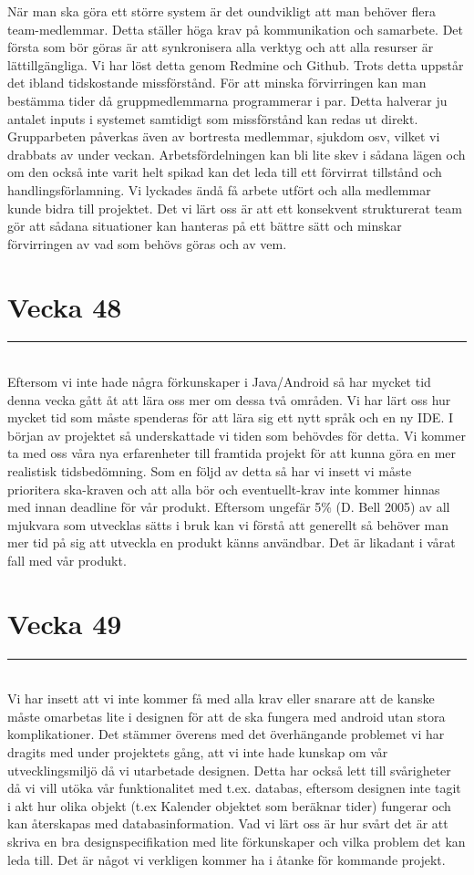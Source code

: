 \documentclass{article}
\newcommand{\HRule}{\rule{\linewidth}{0.5mm}}
\begin{document}
När man ska göra ett större system är det oundvikligt att man behöver flera team-medlemmar.
Detta ställer höga krav på kommunikation och samarbete. Det första som bör göras är att synkronisera alla verktyg och att alla resurser är lättillgängliga.
Vi har löst detta genom Redmine och Github. Trots detta uppstår det ibland tidskostande missförstånd. För att minska förvirringen kan man bestämma tider då gruppmedlemmarna programmerar i par.
Detta halverar ju antalet inputs i systemet samtidigt som missförstånd kan redas ut direkt.
Grupparbeten påverkas även av bortresta medlemmar, sjukdom osv, vilket vi drabbats av under veckan.
Arbetsfördelningen kan bli lite skev i sådana lägen och om den också inte varit helt spikad kan det leda till ett förvirrat tillstånd och handlingsförlamning.
Vi lyckades ändå få arbete utfört och alla medlemmar kunde bidra till projektet.
Det vi lärt oss är att ett konsekvent strukturerat team gör att sådana situationer kan hanteras på ett bättre sätt och minskar förvirringen av vad som behövs göras och av vem.

\section*{ {\center Vecka 48} }
\HRule \\[2 cm]

Eftersom vi inte hade några förkunskaper i Java/Android så har mycket tid denna vecka gått åt att lära oss mer om dessa två områden. Vi har lärt oss hur mycket tid som måste spenderas för att lära sig ett nytt språk och en ny IDE.
I början av projektet så underskattade vi tiden som behövdes för detta. Vi kommer ta med oss våra nya erfarenheter till framtida projekt för att kunna göra en mer realistisk tidsbedömning.
Som en följd av detta så har vi insett vi måste prioritera ska-kraven och att alla bör och eventuellt-krav inte kommer hinnas med innan deadline för vår produkt.
Eftersom ungefär 5\% (D. Bell 2005) av all mjukvara som utvecklas sätts i bruk kan vi förstå att generellt så behöver man mer tid på sig att utveckla en produkt känns användbar. Det är likadant i vårat fall med vår produkt.

\section*{ {\center Vecka 49} }
\HRule \\[2 cm]

Vi har insett att vi inte kommer få med alla krav eller snarare att de kanske måste omarbetas lite i designen för att de ska fungera med android utan stora komplikationer. Det stämmer överens med det överhängande problemet vi har dragits med under projektets gång, att vi inte hade kunskap om vår utvecklingsmiljö då vi utarbetade designen. 
Detta har också lett till svårigheter då vi vill utöka vår funktionalitet med t.ex. databas, eftersom designen inte tagit i akt hur olika objekt (t.ex Kalender objektet som beräknar tider) fungerar och kan återskapas med databasinformation. 
Vad vi lärt oss är hur svårt det är att skriva en bra designspecifikation med lite förkunskaper och vilka problem det kan leda till. Det är något vi verkligen kommer ha i åtanke för kommande projekt.
\end{document}
